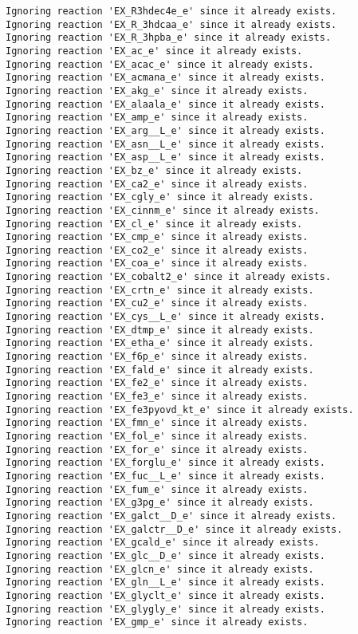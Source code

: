 \documentclass[
  letterpaper,
  DIV=11,
  numbers=noendperiod]{scrartcl}
\begin{document}
\begin{verbatim}
Ignoring reaction 'EX_R3hdec4e_e' since it already exists.
Ignoring reaction 'EX_R_3hdcaa_e' since it already exists.
Ignoring reaction 'EX_R_3hpba_e' since it already exists.
Ignoring reaction 'EX_ac_e' since it already exists.
Ignoring reaction 'EX_acac_e' since it already exists.
Ignoring reaction 'EX_acmana_e' since it already exists.
Ignoring reaction 'EX_akg_e' since it already exists.
Ignoring reaction 'EX_alaala_e' since it already exists.
Ignoring reaction 'EX_amp_e' since it already exists.
Ignoring reaction 'EX_arg__L_e' since it already exists.
Ignoring reaction 'EX_asn__L_e' since it already exists.
Ignoring reaction 'EX_asp__L_e' since it already exists.
Ignoring reaction 'EX_bz_e' since it already exists.
Ignoring reaction 'EX_ca2_e' since it already exists.
Ignoring reaction 'EX_cgly_e' since it already exists.
Ignoring reaction 'EX_cinnm_e' since it already exists.
Ignoring reaction 'EX_cl_e' since it already exists.
Ignoring reaction 'EX_cmp_e' since it already exists.
Ignoring reaction 'EX_co2_e' since it already exists.
Ignoring reaction 'EX_coa_e' since it already exists.
Ignoring reaction 'EX_cobalt2_e' since it already exists.
Ignoring reaction 'EX_crtn_e' since it already exists.
Ignoring reaction 'EX_cu2_e' since it already exists.
Ignoring reaction 'EX_cys__L_e' since it already exists.
Ignoring reaction 'EX_dtmp_e' since it already exists.
Ignoring reaction 'EX_etha_e' since it already exists.
Ignoring reaction 'EX_f6p_e' since it already exists.
Ignoring reaction 'EX_fald_e' since it already exists.
Ignoring reaction 'EX_fe2_e' since it already exists.
Ignoring reaction 'EX_fe3_e' since it already exists.
Ignoring reaction 'EX_fe3pyovd_kt_e' since it already exists.
Ignoring reaction 'EX_fmn_e' since it already exists.
Ignoring reaction 'EX_fol_e' since it already exists.
Ignoring reaction 'EX_for_e' since it already exists.
Ignoring reaction 'EX_forglu_e' since it already exists.
Ignoring reaction 'EX_fuc__L_e' since it already exists.
Ignoring reaction 'EX_fum_e' since it already exists.
Ignoring reaction 'EX_g3pg_e' since it already exists.
Ignoring reaction 'EX_galct__D_e' since it already exists.
Ignoring reaction 'EX_galctr__D_e' since it already exists.
Ignoring reaction 'EX_gcald_e' since it already exists.
Ignoring reaction 'EX_glc__D_e' since it already exists.
Ignoring reaction 'EX_glcn_e' since it already exists.
Ignoring reaction 'EX_gln__L_e' since it already exists.
Ignoring reaction 'EX_glyclt_e' since it already exists.
Ignoring reaction 'EX_glygly_e' since it already exists.
Ignoring reaction 'EX_gmp_e' since it already exists.

\end{verbatim}
\end{document}
